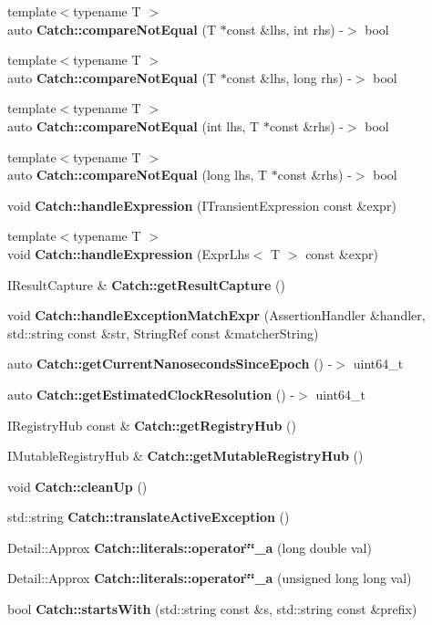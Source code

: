 \begin{DoxyCompactItemize}
\item 
{\footnotesize template$<$typename T $>$ }\\auto \textbf{ Catch\+::compare\+Not\+Equal} (T $\ast$const \&lhs, int rhs) -\/$>$ bool
\item 
{\footnotesize template$<$typename T $>$ }\\auto \textbf{ Catch\+::compare\+Not\+Equal} (T $\ast$const \&lhs, long rhs) -\/$>$ bool
\item 
{\footnotesize template$<$typename T $>$ }\\auto \textbf{ Catch\+::compare\+Not\+Equal} (int lhs, T $\ast$const \&rhs) -\/$>$ bool
\item 
{\footnotesize template$<$typename T $>$ }\\auto \textbf{ Catch\+::compare\+Not\+Equal} (long lhs, T $\ast$const \&rhs) -\/$>$ bool
\item 
void \textbf{ Catch\+::handle\+Expression} (I\+Transient\+Expression const \&expr)
\item 
{\footnotesize template$<$typename T $>$ }\\void \textbf{ Catch\+::handle\+Expression} (Expr\+Lhs$<$ T $>$ const \&expr)
\item 
I\+Result\+Capture \& \textbf{ Catch\+::get\+Result\+Capture} ()
\item 
void \textbf{ Catch\+::handle\+Exception\+Match\+Expr} (Assertion\+Handler \&handler, std\+::string const \&str, String\+Ref const \&matcher\+String)
\item 
auto \textbf{ Catch\+::get\+Current\+Nanoseconds\+Since\+Epoch} () -\/$>$ uint64\+\_\+t
\item 
auto \textbf{ Catch\+::get\+Estimated\+Clock\+Resolution} () -\/$>$ uint64\+\_\+t
\item 
I\+Registry\+Hub const  \& \textbf{ Catch\+::get\+Registry\+Hub} ()
\item 
I\+Mutable\+Registry\+Hub \& \textbf{ Catch\+::get\+Mutable\+Registry\+Hub} ()
\item 
void \textbf{ Catch\+::clean\+Up} ()
\item 
std\+::string \textbf{ Catch\+::translate\+Active\+Exception} ()
\item 
Detail\+::\+Approx \textbf{ Catch\+::literals\+::operator\char`\"{}\char`\"{}\+\_\+a} (long double val)
\item 
Detail\+::\+Approx \textbf{ Catch\+::literals\+::operator\char`\"{}\char`\"{}\+\_\+a} (unsigned long long val)
\item 
bool \textbf{ Catch\+::starts\+With} (std\+::string const \&s, std\+::string const \&prefix)

\end{DoxyCompactItemize}

